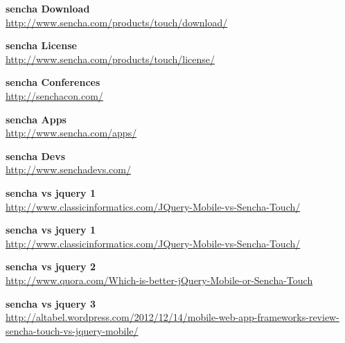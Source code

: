 \documentclass[a4paper,12pt]{book}
\begin{document}
\begin{thebibliography}{25}
\textbf{sencha Download}\\
{\footnotesize\url{http://www.sencha.com/products/touch/download/}}

\textbf{sencha License}\\
{\footnotesize\url{http://www.sencha.com/products/touch/license/}}

\textbf{sencha Conferences}\\
{\footnotesize\url{http://senchacon.com/}}

\textbf{sencha Apps}\\
{\footnotesize\url{http://www.sencha.com/apps/}}

\textbf{sencha Devs}\\
{\footnotesize\url{http://www.senchadevs.com/}}

\textbf{sencha vs jquery 1}\\
{\footnotesize\url{http://www.classicinformatics.com/JQuery-Mobile-vs-Sencha-Touch/}}

\textbf{sencha vs jquery 1}\\
{\footnotesize\url{http://www.classicinformatics.com/JQuery-Mobile-vs-Sencha-Touch/}}

\textbf{sencha vs jquery 2}\\
{\footnotesize\url{http://www.quora.com/Which-is-better-jQuery-Mobile-or-Sencha-Touch}}

\textbf{sencha vs jquery 3}\\
{\footnotesize\url{http://altabel.wordpress.com/2012/12/14/mobile-web-app-frameworks-review-sencha-touch-vs-jquery-mobile/}}

\end{thebibliography}
\end{document}
